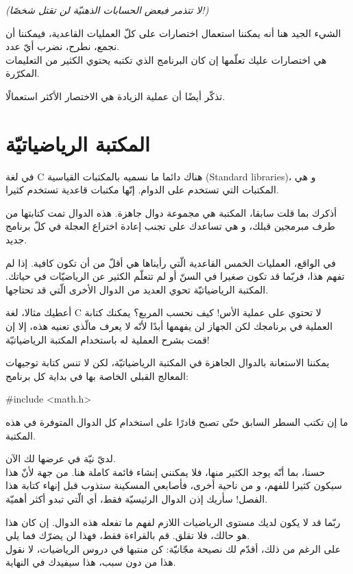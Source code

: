 \textit{(لا تتذمر فبعض الحسابات الذهنيّة لن تقتل شخصًا!)}

الشيء الجيد هنا أنه يمكننا استعمال اختصارات على كلّ العمليات القاعدية، فيمكننا أن نجمع، نطرح، نضرب أيّ عدد.\\
هي اختصارات عليك تعلّمها إن كان البرنامج الذي تكتبه يحتوي الكثير من التعليمات المكرّرة.

تذكّر أيضًا أن عملية الزيادة هي الاختصار الأكثر استعمالًا.

\section{المكتبة الرياضياتيّة}

في لغة \textenglish{C}
هناك دائما ما نسميه بالمكتبات القياسية
(\textenglish{Standard libraries})،
 و هي المكتبات التي تستخدم على الدوام. إنّها مكتبات قاعدية تستخدم كثيرا.

أذكرك بما قلت سابقا، المكتبة هي مجموعة دوال جاهزة. هذه الدوال تمت كتابتها من طرف مبرمجين قبلك، و هي تساعدك على تجنب إعادة اختراع العجلة في كلّ برنامج جديد.

في الواقع، العمليات الخمس القاعدية الّتي رأيناها هي أقلّ من أن تكون كافية. إذا لم تفهم هذا، فربّما قد تكون صغيرا في السنّ أو لم تتعلّم الكثير عن الرياضيّات في حياتك. المكتبة الرياضياتيّة تحوي العديد من الدوال الأخرى الّتي قد تحتاجها.


أعطيك مثالا، لغة \textenglish{C}
لا تحتوي على عملية الأس! كيف نحسب المربع؟ يمكنك كتابة العملية
في برنامجك لكن الجهاز لن يفهمها أبدًا لأنّه لا يعرف مالّذي تعنيه هذه، إلا إن قمت بشرح العملية له باستخدام المكتبة الرياضياتيّة!

يمكننا الاستعانة بالدوال الجاهزة في المكتبة الرياضياتيّة، لكن لا تنس كتابة توجيهات المعالج القبلي الخاصة بها في بداية كل برنامج:

\begin{Csource}
#include <math.h>
\end{Csource}

ما إن تكتب السطر السابق حتّى تصبح قادرًا على استخدام كل الدوال المتوفرة في هذه المكتبة.

لديّ نيّة في عرضها لك الآن.\\
حسنا، بما أنّه يوجد الكثير منها، فلا يمكنني إنشاء قائمة كاملة هنا. من جهة لأنّ هذا سيكون كثيرا للفهم، و من ناحية أخرى، فأصابعي  المسكينة ستذوب قبل إنهاء كتابة هذا الفصل! سأريك إذن الدوال الرئيسيّة فقط، أي الّتي تبدو أكثر أهميّة.

\begin{information}
ربّما قد لا يكون لديك مستوى  الرياضيات اللازم لفهم ما تفعله هذه الدوال. إن كان هذا هو حالك، فلا تقلق. قم بالقراءة فقط، فهذا لن يضرّك فما يلي.\\
على الرغم من ذلك، أقدّم لك نصيحة مجّانيّة: كن منتبها في دروس الرياضيات، لا نقول هذا من دون سبب، هذا سيفيدك في النهاية.
\end{information}

